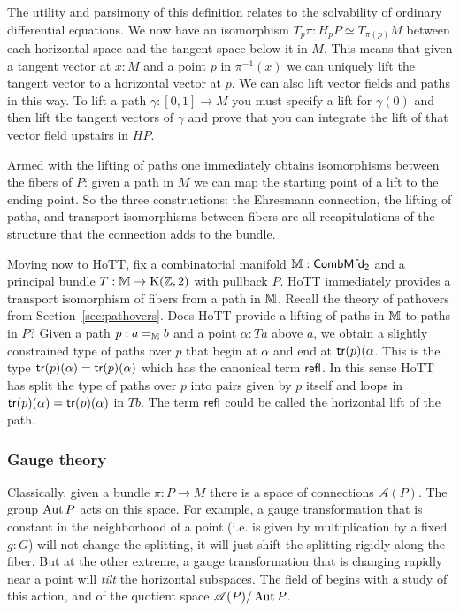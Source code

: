 The utility and parsimony of this definition relates to the solvability of ordinary differential equations. We now have an isomorphism \( T_p\pi:H_pP\simeq T_{\pi(p)}M \) between each horizontal space and the tangent space below it in \( M \). This means that given a tangent vector at \( x:M \) and a point \( p \) in \( \pi^{-1}(x) \) we can uniquely lift the tangent vector to a horizontal vector at \( p \). We can also lift vector fields and paths in this way. To lift a path \( \gamma:[0,1]\to M \) you must specify a lift for \( \gamma(0) \) and then lift the tangent vectors of \( \gamma \) and prove that you can integrate the lift of that vector field upstairs in \( HP \).

Armed with the lifting of paths one immediately obtains isomorphisms between the fibers of \( P \): given a path in \( M \) we can map the starting point of a lift to the ending point. So the three constructions: the Ehresmann connection, the lifting of paths, and transport isomorphisms between fibers are all recapitulations of the structure that the connection adds to the bundle.

Moving now to HoTT, fix a combinatorial manifold \( \mathbb{M}:\mathsf{CombMfd_2} \) and a principal bundle \( T:\mathbb{M}\to\mathrm{K}(\mathbb{Z},2) \) with pullback \( P \). HoTT immediately provides a transport isomorphism of fibers from a path in \( \mathbb{M} \). Recall the theory of pathovers from Section~\ref{sec:pathovers}. Does HoTT provide a lifting of paths in \( \mathbb{M} \) to paths in \( P \)? Given a path \( p:a=_{\mathbb{M}} b \) and a point \( \alpha:Ta \) above \( a \), we obtain a slightly constrained type of paths over \( p \) that begin at \( \alpha \) and end at \( \mathsf{tr}(p)(\alpha \). This is the type \( \mathsf{tr}(p)(\alpha)=\mathsf{tr}(p)(\alpha) \) which has the canonical term \( \mathsf{refl} \). In this sense HoTT has split the type of paths over \( p \) into pairs given by \( p \) itself and loops in \( \mathsf{tr}(p)(\alpha)=\mathsf{tr}(p)(\alpha) \) in \( Tb \). The term \( \mathsf{refl} \) could be called the horizontal lift of the path.

\subsubsection{Gauge theory}

Classically, given a bundle \( \pi:P\to M \) there is a space of connections \( \mathscr{A}(P) \). The group \( \operatorname{Aut} P \) acts on this space. For example, a gauge transformation that is constant in the neighborhood of a point (i.e. is given by multiplication by a fixed \( g:G \)) will not change the splitting, it will just shift the splitting rigidly along the fiber. But at the other extreme, a gauge transformation that is changing rapidly near a point will \emph{tilt} the horizontal subspaces. The field of  begins with a study of this action, and of the quotient space \( \mathscr{A}(P)/\operatorname{Aut} P \).

